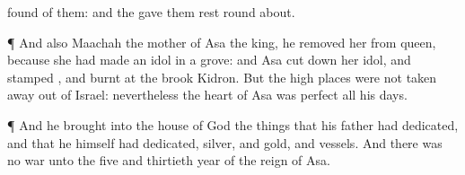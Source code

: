 {found of them: and the
{} gave them
rest round
about.
\par }{\PP {}¶ And also
{}
Maachah the
mother of
Asa the
king, he
removed her from
{}
queen, because she had
made an
idol in a
grove: and
Asa cut
down her
idol, and
stamped
{}, and
burnt
{} at the
brook
Kidron.
But the high
places were not taken
away out of
Israel: nevertheless the
heart of
Asa was
perfect all his
days.
\par }{\PP {}¶ And he
brought into the
house of
God the things that his
father had
dedicated, and that he himself had
dedicated,
silver, and
gold, and
vessels.
And there was no
{}
war unto the
five and
thirtieth
year of the
reign of
Asa.

}
